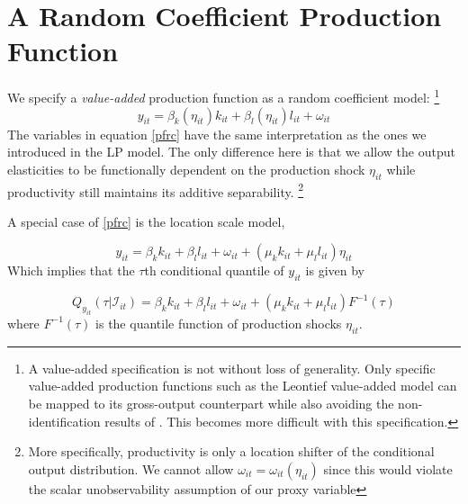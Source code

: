 \documentclass[11pt]{article}
\begin{document}
\section{A Random Coefficient Production Function} \label{ourmodel}
We specify a \textit{value-added} production function as a random coefficient model:
\footnote{A value-added specification is not without loss of generality. Only specific value-added production functions such as the Leontief value-added model can be mapped to its gross-output counterpart while also avoiding the non-identification results of \cite{Gandhi2020}. This becomes more difficult with this specification.}
\begin{equation} \label{pfrc}
    y_{it}=\beta_{k}(\eta_{it})k_{it}+\beta_{l}(\eta_{it})l_{it}+\omega_{it}
\end{equation}
The variables in equation \eqref{pfrc} have the same interpretation as the ones we introduced in the LP model. The only difference here is that we allow the output elasticities to be functionally dependent on the production shock $\eta_{it}$ while productivity still maintains its additive separability. \footnote{More specifically, productivity is only a location shifter of the conditional output distribution. We cannot allow $\omega_{it}=\omega_{it}(\eta_{it})$ since this would violate the scalar unobservability assumption of our proxy variable}

A special case of \eqref{pfrc} is the location scale model,

\begin{equation} \label{locationscale}
    y_{it}=\beta_{k}k_{it}+\beta_{l}l_{it}+\omega_{it}+(\mu_{k}k_{it}+\mu_{l}l_{it})\eta_{it}
\end{equation}
Which implies that the $\tau$th conditional quantile of $y_{it}$ is given by

\begin{equation}
Q_{y_{it}}(\tau|\mathcal{I}_{it})=\beta_{k}k_{it}+\beta_{l}l_{it}+\omega_{it}+(\mu_{k}k_{it}+\mu_{l}l_{it})F^{-1}(\tau)
\end{equation}
where $F^{-1}(\tau)$ is the quantile function of production shocks $\eta_{it}$.
\end{document}
